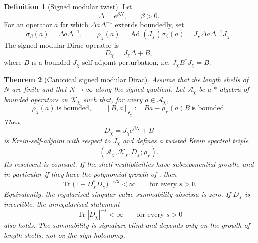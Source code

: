 \documentclass[11pt]{article}
\newtheorem{theorem}{Theorem}[section]
\theoremstyle{definition}
\newtheorem{definition}[theorem]{Definition}
\theoremstyle{remark}
\newcommand{\Kh}{\mathcal{K}}
\begin{document}
\begin{definition}[Signed modular twist]
\label{def:signed-modular-twist}
Let
\[
  \Delta=e^{\beta N},\qquad \beta>0.
\]
For an operator $a$ for which $\Delta a\Delta^{-1}$ extends boundedly, set
\[
  \sigma_\beta(a)=\Delta a\Delta^{-1},
  \qquad
  \rho_\chi(a)=\operatorname{Ad}(J_\chi)\sigma_\beta(a)
  =J_\chi\Delta a\Delta^{-1}J_\chi .
\]
The signed modular Dirac operator is
\[
  D_\chi=J_\chi\Delta+B,
\]
where $B$ is a bounded $J_\chi$-self-adjoint perturbation, i.e.
$J_\chi B^*J_\chi=B$.
\end{definition}

\begin{theorem}[Canonical signed modular Dirac]
\label{thm:signed-dirac}
Assume that the length shells of $N$ are finite and that $N\to\infty$ along the
signed quotient.  Let $\mathcal A_\chi$ be a $*$-algebra of bounded operators on
$\Kh_\chi$ such that, for every $a\in\mathcal A_\chi$,
\[
  \rho_\chi(a)\ \text{is bounded},
  \qquad
  [B,a]_{\rho_\chi}:=Ba-\rho_\chi(a)B\ \text{is bounded}.
\]
Then
\[
  D_\chi=J_\chi e^{\beta N}+B
\]
is Krein-self-adjoint with respect to $J_\chi$ and defines a twisted Krein
spectral triple
\[
  (\mathcal A_\chi,\Kh_\chi,D_\chi;\rho_\chi).
\]
Its resolvent is compact.  If the shell multiplicities have subexponential
growth, and in particular if they have the polynomial growth of
, then
\[
  \operatorname{Tr}\bigl(1+D_\chi^*D_\chi\bigr)^{-s/2}<\infty
  \qquad\text{for every }s>0 .
\]
Equivalently, the regularised singular-value summability abscissa is zero.  If
\(D_\chi\) is invertible, the unregularised statement
\[
  \operatorname{Tr}|D_\chi|^{-s}<\infty
  \qquad\text{for every }s>0
\]
also holds.  The summability is signature-blind and depends only on the growth
of length shells, not on the sign holonomy.
\end{theorem}
\end{document}
